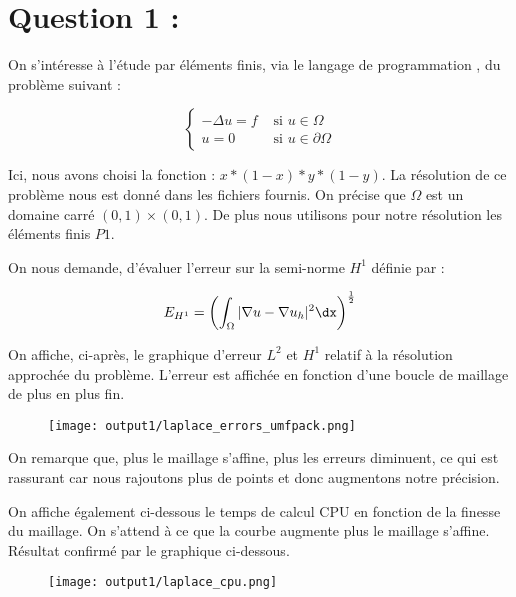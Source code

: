 \documentclass[11pt,a4paper]{report}
\begin{document}
	
	
		\section*{Question 1 :}
		
			On s'intéresse à l'étude par éléments finis, via le langage de programmation , du problème suivant : 
				
			\[
				\left\{
				\begin{array}{ll}
				- \Delta u = f & \mbox{ si } u \in \Omega \\
				u = 0 & \mbox{ si } u \in \partial\Omega
				\end{array}
				\right.
			\]
			
			Ici, nous avons choisi la fonction : $x*(1-x)*y*(1-y)$. La résolution de ce problème nous est donné dans les fichiers fournis. On précise que $\Omega$ est un domaine carré $(0,1)\times(0,1)$. De plus nous utilisons pour notre résolution les éléments finis $P1$.
			
			On nous demande, d'évaluer l'erreur sur la semi-norme $H^1$ définie par : 
			
			\[
				E_{H^1} = \displaystyle \left(\int_{\Omega} |\nabla u - \nabla u_h|^2 \dx \right)^{\frac{1}{2}}
			\]
		
		
			On affiche, ci-après, le graphique d'erreur $L^2$ et $H^1$ relatif à la résolution approchée du problème. L'erreur est affichée en fonction d'une boucle de maillage de plus en plus fin.
			
			\begin{figure}[H]
				\centering
				\texttt{[image: output1/laplace\_errors\_umfpack.png]}
			\end{figure}
		
			On remarque que, plus le maillage s'affine, plus les erreurs diminuent, ce qui est rassurant car nous rajoutons plus de points et donc augmentons notre précision.
		
		
			On affiche également ci-dessous le temps de calcul CPU en fonction de la finesse du maillage. On s'attend à ce que la courbe augmente plus le maillage s'affine. Résultat confirmé par le graphique ci-dessous.
		
			\begin{figure}[H]
				\centering
				\texttt{[image: output1/laplace\_cpu.png]}
			\end{figure}
		
\end{document}

